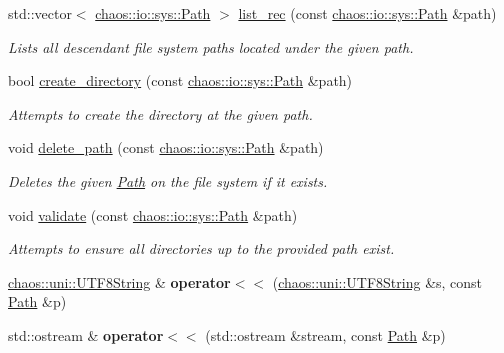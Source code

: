\begin{DoxyCompactItemize}
std\-::vector$<$ \hyperlink{classchaos_1_1io_1_1sys_1_1_path}{chaos\-::io\-::sys\-::\-Path} $>$ \hyperlink{namespacechaos_1_1io_1_1sys_a956856df76f476b3300ab1ebe733e2a7}{list\-\_\-rec} (const \hyperlink{classchaos_1_1io_1_1sys_1_1_path}{chaos\-::io\-::sys\-::\-Path} \&path)
\begin{DoxyCompactList}\small\item\em Lists all descendant file system paths located under the given path. \end{DoxyCompactList}\item 
bool \hyperlink{namespacechaos_1_1io_1_1sys_a6bcdadf916b110395f4a2627c049da11}{create\-\_\-directory} (const \hyperlink{classchaos_1_1io_1_1sys_1_1_path}{chaos\-::io\-::sys\-::\-Path} \&path)
\begin{DoxyCompactList}\small\item\em Attempts to create the directory at the given path. \end{DoxyCompactList}\item 
void \hyperlink{namespacechaos_1_1io_1_1sys_afe2226ee576ac8aba15ca3baa0322ff6}{delete\-\_\-path} (const \hyperlink{classchaos_1_1io_1_1sys_1_1_path}{chaos\-::io\-::sys\-::\-Path} \&path)
\begin{DoxyCompactList}\small\item\em Deletes the given \hyperlink{classchaos_1_1io_1_1sys_1_1_path}{Path} on the file system if it exists. \end{DoxyCompactList}\item 
void \hyperlink{namespacechaos_1_1io_1_1sys_a15e20b105c40cf4d73b13afe87ce1781}{validate} (const \hyperlink{classchaos_1_1io_1_1sys_1_1_path}{chaos\-::io\-::sys\-::\-Path} \&path)
\begin{DoxyCompactList}\small\item\em Attempts to ensure all directories up to the provided path exist. \end{DoxyCompactList}\item 
\hypertarget{namespacechaos_1_1io_1_1sys_a669178b3843d1716570b4b5ca8fd417d}{\hyperlink{classchaos_1_1uni_1_1_u_t_f8_string}{chaos\-::uni\-::\-U\-T\-F8\-String} \& {\bfseries operator$<$$<$} (\hyperlink{classchaos_1_1uni_1_1_u_t_f8_string}{chaos\-::uni\-::\-U\-T\-F8\-String} \&s, const \hyperlink{classchaos_1_1io_1_1sys_1_1_path}{Path} \&p)}\label{namespacechaos_1_1io_1_1sys_a669178b3843d1716570b4b5ca8fd417d}

\item 
\hypertarget{namespacechaos_1_1io_1_1sys_aa28fa69e8966c0ff55c3b59cdff9cebc}{std\-::ostream \& {\bfseries operator$<$$<$} (std\-::ostream \&stream, const \hyperlink{classchaos_1_1io_1_1sys_1_1_path}{Path} \&p)}\label{namespacechaos_1_1io_1_1sys_aa28fa69e8966c0ff55c3b59cdff9cebc}

\end{DoxyCompactItemize}


